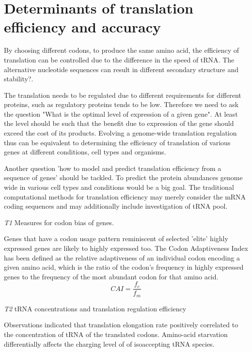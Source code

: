 \documentclass[paper=a4, fontsize=12pt]{scrartcl}	%
\numberwithin{equation}{section}					%
\numberwithin{figure}{section}					%
\numberwithin{table}{section}					%
\begin{document}
\section{Determinants of translation efficiency and accuracy}
By choosing different codons, to produce the same amino acid, the efficiency of translation can be controlled due to the difference in the speed of tRNA. The alternative nucleotide sequences can result in different secondary structure and stability?. 

The translation needs to be regulated due to different requirements for different proteins, such as regulatory proteins tends to be low. Therefore we need to ask the question "What is the optimal level of expression of a given gene". At least the level should be such that the benefit due to expression of the gene should exceed the cost of its products. Evolving a genome-wide translation regulation thus can be equivalent to determining the efficiency of translation of various genes at different conditions, cell types and organisms. 

Another question 'how to model and predict translation efficiency from a sequence of genes' should be tackled. To predict the protein abundances genome wide in various cell types and conditions would be a big goal. The traditional computational methods for translation efficiency may merely consider the mRNA coding sequences and may additionally include investigation of tRNA pool. 

{\it T1} Measures for codon bias of genes. 

Genes that have a codon usage pattern reminiscent of selected 'elite' highly expressed genes are likely to highly expressed too. The Codon Adaptiveness Index has been defined as the relative adaptiveness of an individual codon encoding a given amino acid, which is the ratio of the codon's frequency in highly expressed genes to the frequency of the most abundant codon for that amino acid. 
\begin{equation}
CAI = \frac{f_c}{f_m}
\end{equation}

{\it T2} tRNA concentrations and translation regulation efficiency

Observations indicated that translation elongation rate positively correlated to the concentration of tRNA of the translated codons. 
Amino-acid starvation differentially affects the charging level of of isoaccepting tRNA species. 
\end{document}
